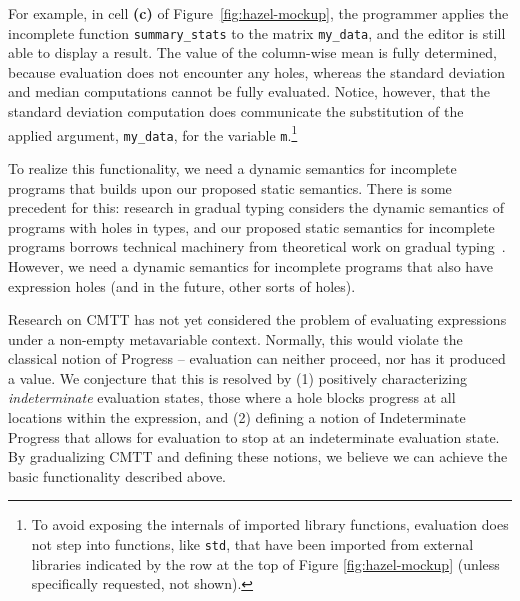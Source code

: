 \documentclass[letterpaper,USenglish]{lipics-v2016}
\let\li\lstinline
\begin{document}
For example, in cell \textbf{(c)} of Figure~\ref{fig:hazel-mockup}, the
programmer applies  the incomplete function \li{summary_stats} to 
the matrix \lstinline{my_data}, and 
the editor is still able to display a result.
The value of the column-wise mean is fully determined, because evaluation does
not encounter any holes, whereas the standard deviation and median computations
cannot be fully evaluated. Notice, however, that the standard
deviation computation does communicate the substitution of the applied argument,
\li{my_data}, for the variable \li{m}.\footnote{To avoid exposing the internals
of imported library functions, evaluation does not step into functions, like
\li{std}, that have been imported from external libraries indicated by the row at the top of Figure \ref{fig:hazel-mockup} (unless specifically
requested, not shown).}

To realize this functionality, we need a
{dynamic semantics for incomplete programs} that builds upon our proposed
static semantics. There is some precedent for this: research in gradual typing
considers the dynamic semantics of programs with holes in types, and our
proposed static semantics for incomplete programs borrows technical machinery
from theoretical work on gradual typing~\cite{Siek06a}. However, we need a dynamic semantics for 
 incomplete programs that also have expression holes (and in the future, other sorts of holes). 

Research on CMTT has not yet 
 considered the problem of evaluating expressions under a non-empty metavariable context. 
Normally, this would violate the classical notion of Progress -- 
evaluation can neither proceed, nor has it produced a value. We conjecture that this is
resolved by (1) positively characterizing \emph{indeterminate} 
evaluation states, those where a hole blocks progress at all locations
within the expression, and (2) defining
a notion of Indeterminate Progress that allows for evaluation to stop at an 
indeterminate evaluation state. By gradualizing CMTT and defining these notions, we believe we can achieve the basic functionality described above.

\end{document}
